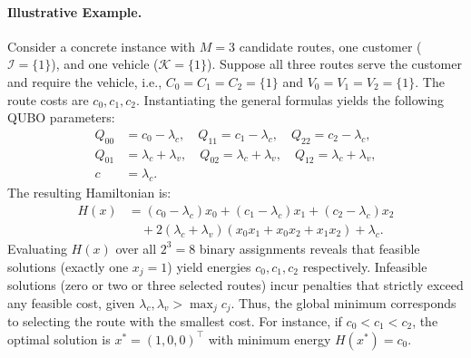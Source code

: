 \documentclass[12pt]{article}
\begin{document}
\paragraph{Illustrative Example.}
Consider a concrete instance with $M = 3$ candidate routes, one customer ($\mathcal{I} = \{1\}$), and one vehicle ($\mathcal{K} = \{1\}$). Suppose all three routes serve the customer and require the vehicle, i.e., $C_0 = C_1 = C_2 = \{1\}$ and $V_0 = V_1 = V_2 = \{1\}$. The route costs are $c_0, c_1, c_2$.
Instantiating the general formulas yields the following QUBO parameters:
\begin{align}
  Q_{00} &= c_0 - \lambda_c, \quad Q_{11} = c_1 - \lambda_c, \quad Q_{22} = c_2 - \lambda_c, \\
  Q_{01} &= \lambda_c + \lambda_v, \quad Q_{02} = \lambda_c + \lambda_v, \quad Q_{12} = \lambda_c + \lambda_v, \\
  c &= \lambda_c.
\end{align}
The resulting Hamiltonian is:
\begin{align}
  H(x) &= (c_0 - \lambda_c)x_0 + (c_1 - \lambda_c)x_1 + (c_2 - \lambda_c)x_2 \nonumber \\
  &\quad + 2(\lambda_c + \lambda_v)(x_0 x_1 + x_0 x_2 + x_1 x_2) + \lambda_c.
\end{align}
Evaluating $H(x)$ over all $2^3 = 8$ binary assignments reveals that feasible solutions (exactly one $x_j = 1$) yield energies $c_0, c_1, c_2$ respectively. Infeasible solutions (zero or two or three selected routes) incur penalties that strictly exceed any feasible cost, given $\lambda_c, \lambda_v > \max_j c_j$. Thus, the global minimum corresponds to selecting the route with the smallest cost. For instance, if $c_0 < c_1 < c_2$, the optimal solution is $x^* = (1, 0, 0)^\top$ with minimum energy $H(x^*) = c_0$.
\end{document}

